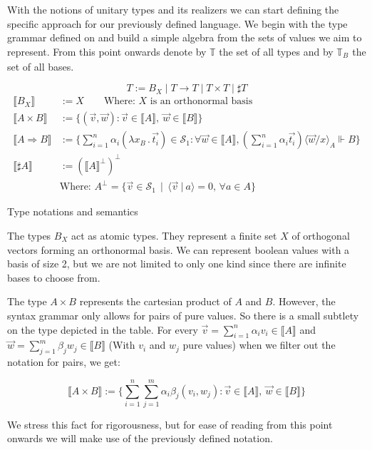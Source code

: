 \documentclass[runningheads,orivec,envcountsame,envcountsect]{llncs}
\newcommand\comp[2][]{#2^{\bot^{#1}}}
\newcommand\ansubst[2]{\ensuremath{\langle #1 \rangle_{#2}}}
\def\Sph{\mathcal{S}_1}       %
\def\scal#1#2{\langle{#1}~|~{#2}\rangle}
\def\Lam#1#2#3{\lambda#1_{#2}\,{.}\,#3} %
\def\Arr{\Rightarrow}
\def\Type{\mathbb{T}}
\def\BasisType{\Type_{\basis{}}}
\def\sem#1{\llbracket#1\rrbracket}
\def\real{\Vdash}
\newcommand\basis[1]{\ensuremath{B_{ #1 }}}
\begin{document}
With the notions of unitary types and its realizers we can start defining the specific approach for our previously defined language. We begin with the type grammar defined on  and build a simple algebra from the sets of values we aim to represent. From this point onwards denote by $\Type$ the set of all types and by $\BasisType$ the set of all bases.

\begin{table*}[tb]
  \scriptsize
    \[
    T := \basis{X} \mid T\to T \mid T\times T \mid \sharp T
    \]
    \begin{align*}
    \sem{\basis{X}}&:= X\qquad\text{Where: $X$ is an orthonormal basis}\\
    \sem{A\times B}&:= \bigl\{ (\vec v, \vec w): \vec v \in{\sem{A}},~\vec w\in\sem{B}\bigr\}\\
    \sem{A\Arr B}&:=
    \bigl\{\sum_{i=1}^{n}\alpha_i(\Lam{x}{B}{\vec{t_i}})\in\Sph:\forall\vec{w}\in\sem{A}, (\sum_{i=1}^{n}\alpha_i \vec{t_i})\ansubst{\vec{w}/x}{A}\real B\bigr\}\\
    \sem{\sharp{A}}&:= {(\sem{A}^\bot)}^\bot\\
    &\text{Where: }\comp{A} = \{ \vec{v}\in \Sph \,\mid\, \scal{\vec{v}}{a} = 0,\, \forall a\in A\}
  \end{align*}
  \caption{Type notations and semantics}
  \label{tab:UnitaryTypes}
\end{table*}

The types $\basis{X}$ act as atomic types. They represent a finite set $X$ of orthogonal vectors forming an orthonormal basis. We can represent boolean values with a basis of size 2, but we are not limited to only one kind since there are infinite bases to choose from.

The type $A\times B$ represents the cartesian product of $A$ and $B$. However, the syntax grammar only allows for pairs of pure values. So there is a small subtlety on the type depicted in the table. For every $\vec{v}=\sum_{i=1}^{n}\alpha_i v_i\in\sem{A}$ and $\vec{w}=\sum_{j=1}^{m}\beta_j w_j\in\sem{B}$ (With $v_i$ and $w_j$ pure values) when we filter out the notation for pairs, we get:

\[
  \sem{A\times B}:= \bigl\{ \sum_{i=1}^{n}\sum_{j=1}^{m}\alpha_i\beta_j(v_i, w_j): \vec v \in{\sem{A}},~\vec w\in\sem{B}\bigr\}
\]

We stress this fact for rigorousness, but for ease of reading from this point onwards we will make use of the previously defined notation.
\end{document}
